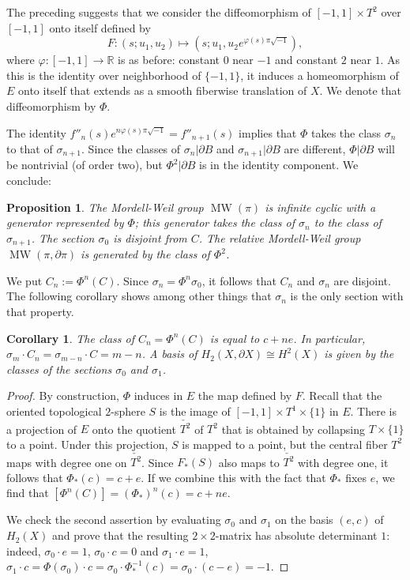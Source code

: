 \documentclass[10pt,letterpaper]{amsart}
\numberwithin{equation}{section}
\def\RR{{\mathbb R}}
\newcommand{\p}{\partial}
\newcommand\MW{\operatorname{MW}}
\newtheorem{proposition}[theorem]{Proposition}
\newtheorem{corollary}[theorem]{Corollary}
\theoremstyle{remark}
\begin{document}
The preceding suggests that we consider the diffeomorphism of $[-1,1]\times T^2$ over $[-1,1]$ onto itself defined by
\[
F: (s; u_1,u_2)\mapsto (s; u_1, u_2 e^{\varphi (s)\pi\sqrt{-1}}),
\]
where $\varphi :[-1,1]\to \RR$ is as before: constant $0$ near $-1$ and constant $2$ near $1$.
As this is the identity over neighborhood of $\{-1,1\}$, it induces a homeomorphism of $E$ onto itself
that extends as a smooth fiberwise translation of $X$. We denote that diffeomorphism by $\Phi$.

The identity $f''_n (s)e^{n\varphi (s)\pi\sqrt{-1}}=f''_{n +1}(s)$ implies that  $\Phi$ takes the class $\sigma_n$ to that of 
$\sigma_{n+1}$. Since the classes of  
$\sigma_n|\p B$ and  $\sigma_{n +1}|\p B$ are different, $\Phi|\p B$ will be nontrivial (of order two), but  $\Phi^2|\p B$ is in the identity component. We conclude:

\begin{proposition}\label{prop:}The Mordell-Weil group  $\MW(\pi)$ is infinite cyclic with a generator 
represented by $\Phi$; this generator takes the class of $\sigma_n$ to the class of  $\sigma_{n+1}$. 
The section $\sigma_0$ is disjoint from $C$.
The relative Mordell-Weil group  $\MW(\pi, \p \pi)$ is generated by the class of $\Phi^2$.
\end{proposition}

We put  $C_n:= \Phi^n (C)$. Since $\sigma_n=\Phi^n\sigma_0$, it follows that $C_n$ and $\sigma_n$ are disjoint.
The following corollary shows among other things that $\sigma_n$ is the only section with that property. 

\begin{corollary}\label{cor:}
The class of  $C_n= \Phi^n (C)$ is equal to  $c+ne$. In particular, $\sigma_m\cdot C_n=\sigma_{m-n}\cdot C=m-n$.
A basis of  $H_2(X, \p X)\cong H^2(X)$ is given by the classes of the sections $\sigma_0$ and $\sigma_1$.
\end{corollary}
\begin{proof}
By construction, $\Phi$ induces in $E$  the map defined by $F$. Recall that the oriented topological $2$-sphere 
$S$ is the image of $ [-1,1]\times T^1\times\{1\}$ in $E$. 
There is a projection of $E$ onto the quotient $\check{T^2}$ of $T^2$ that is obtained by collapsing  $T\times\{1\}$ to a point. Under this projection, $S$ is mapped to a point, but the central fiber $T^2$ maps  with degree one on 
$\check{T^2}$.  Since $F_*(S)$ also maps to $\check{T^2}$ with degree one, it follows that $\Phi_*(c)=c+e$. If we combine this with the fact that $\Phi_*$ fixes $e$, we find that  
$[\Phi^n(C)]=(\Phi_*)^n(c)=c+ne$.

We check the second assertion by evaluating $\sigma_0$  and $\sigma_1$ on the basis $(e,c)$ of 
$H_2(X)$ and prove that the resulting $2\times 2$-matrix has absolute determinant $1$: indeed,  
$\sigma_0 \cdot e=1$, $\sigma_0 \cdot c=0$ and $\sigma_1\cdot e=1$, 
$\sigma_1\cdot c=\Phi(\sigma_0)\cdot c=\sigma_0\cdot  \Phi_*^{-1}(c)=\sigma_0\cdot(c-e)=-1$. 
\end{proof}
\end{document}
